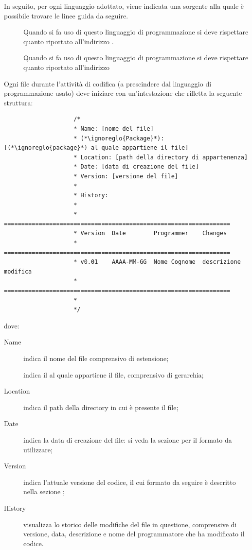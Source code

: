 				In seguito, per ogni linguaggio adottato, viene indicata una sorgente alla quale è possibile trovare le linee guida da seguire.
				\begin{description}
					\item[] Quando si fa uso di questo linguaggio di programmazione si deve rispettare quanto riportato all'indirizzo .
					\item[] Quando si fa uso di questo linguaggio di programmazione si deve rispettare quanto riportato all'indirizzo 
				\end{description}
			 \label{sec:CodificaIntestazione}
				Ogni file  durante l'attività di codifica (a prescindere dal linguaggio di programmazione usato) deve iniziare con un'intestazione che rifletta la seguente struttura:
				\begin{lstlisting}
					/*
					* Name: [nome del file]
					* (*\ignoreglo{Package}*): [(*\ignoreglo{package}*) al quale appartiene il file]
					* Location: [path della directory di appartenenza]
					* Date: [data di creazione del file]
					* Version: [versione del file]
					* 
					* History:
					* 
					* =================================================================
					* Version  Date        Programmer    Changes
					* =================================================================
					* v0.01    AAAA-MM-GG  Nome Cognome  descrizione modifica
					* =================================================================
					*
					*/
				\end{lstlisting}
				dove:
				\begin{description}
					\item[Name] indica il nome del file comprensivo di estensione;
					\item[] indica il  al quale appartiene il file, comprensivo di gerarchia;
					\item[Location] indica il path della directory in cui è presente il file;
					\item[Date] indica la data di creazione del file: si veda la sezione  per il formato da utilizzare;
					\item[Version] indica l'attuale versione del codice, il cui formato da seguire è descritto nella sezione ;
					\item[History] visualizza lo storico delle modifiche del file in questione, comprensive di versione, data, descrizione e nome del programmatore che ha modificato il codice.
				\end{description}
